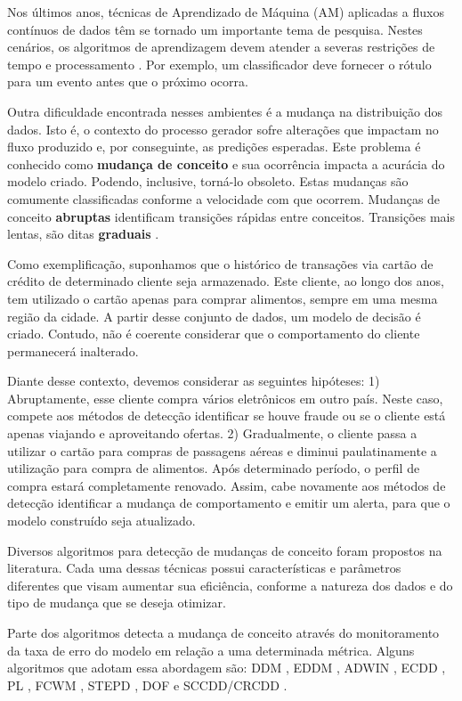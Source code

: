 \documentclass[qual, classic, a4paper]{ufbathesis}
\begin{document}
Nos últimos anos, técnicas de Aprendizado de Máquina (AM) aplicadas a fluxos contínuos de dados têm se tornado um importante tema de pesquisa.
Nestes cenários, os algoritmos de aprendizagem devem atender a severas restrições de tempo e processamento \cite{Bifet:2009:ALM:1656274.1656287}.
Por exemplo, um classificador deve fornecer o rótulo para um evento antes que o próximo ocorra. 

Outra dificuldade encontrada nesses ambientes é a mudança na distribuição dos dados. 
Isto é, o contexto do processo gerador sofre alterações que impactam no fluxo produzido e, por conseguinte, as predições esperadas.
Este problema é conhecido como \textbf{mudança de conceito} \cite{Gama:2010:KDD:1855075} e sua ocorrência impacta a acurácia do modelo criado.
Podendo, inclusive, torná-lo obsoleto.
Estas mudanças são comumente classificadas conforme a velocidade com que ocorrem.
Mudanças de conceito \textbf{abruptas} identificam transições rápidas entre conceitos. 
Transições mais lentas, são ditas \textbf{graduais} \cite{Gama:2014:SCD:2597757.2523813}.

Como exemplificação, suponhamos que o histórico de transações via cartão de crédito de determinado cliente seja armazenado.
Este cliente, ao longo dos anos, tem utilizado o cartão apenas para comprar alimentos, sempre em uma mesma região da cidade.
A partir desse conjunto de dados, um modelo de decisão é criado.
Contudo, não é coerente considerar que o comportamento do cliente permanecerá inalterado.

Diante desse contexto, devemos considerar as seguintes hipóteses:
1) Abruptamente, esse cliente compra vários eletrônicos em outro país.
Neste caso, compete aos métodos de detecção identificar se houve fraude ou se o cliente está apenas viajando e aproveitando ofertas.
2) Gradualmente, o cliente passa a utilizar o cartão para compras de passagens aéreas e diminui paulatinamente a utilização para compra de alimentos.
Após determinado período, o perfil de compra estará completamente renovado.
Assim, cabe novamente aos métodos de detecção identificar a mudança de comportamento e emitir um alerta, 
para que o modelo construído seja atualizado.

Diversos algoritmos para detecção de mudanças de conceito foram propostos na literatura.
Cada uma dessas técnicas possui características e parâmetros diferentes que visam aumentar sua eficiência, 
conforme a natureza dos dados e do tipo de mudança que se deseja otimizar.

Parte dos algoritmos detecta a mudança de conceito através do monitoramento da taxa de erro do modelo em relação a uma determinada métrica.
Alguns algoritmos que adotam essa abordagem são: 
DDM \cite{GamaMCR04}, EDDM \cite{EDDM},  
ADWIN \cite{BifetG07}, ECDD \cite{Ross:2012:EWM:2076039.2076307}, 
PL \cite{Bach:PL:2008}, FCWM \cite{FCWM}, STEPD \cite{STEPD}, DOF \cite{Sobhani:2011:NDD:2045295.2045309} e 
SCCDD/CRCDD \cite{daCosta:2016:UDS:2956219.2956389}.
\end{document}
